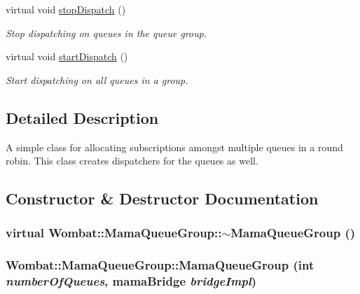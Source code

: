 \begin{DoxyCompactItemize}
virtual void \hyperlink{classWombat_1_1MamaQueueGroup_a90a5e2596ebda29af5bd7bdcdbb63828}{stopDispatch} ()
\begin{DoxyCompactList}\small\item\em Stop dispatching on queues in the queue group. \item\end{DoxyCompactList}\item 
virtual void \hyperlink{classWombat_1_1MamaQueueGroup_a8b0bd3a030e0cc5cab54b2d3347dd47c}{startDispatch} ()
\begin{DoxyCompactList}\small\item\em Start dispatching on all queues in a group. \item\end{DoxyCompactList}\end{DoxyCompactItemize}


\subsection{Detailed Description}
A simple class for allocating subscriptions amongst multiple queues in a round robin. This class creates dispatchers for the queues as well. 

\subsection{Constructor \& Destructor Documentation}
\hypertarget{classWombat_1_1MamaQueueGroup_aa24c28b26b494f159b8c7c5f5cb3e328}{
\subsubsection[{$\sim$MamaQueueGroup}]{\setlength{\rightskip}{0pt plus 5cm}virtual Wombat::MamaQueueGroup::$\sim$MamaQueueGroup ()}}
\label{classWombat_1_1MamaQueueGroup_aa24c28b26b494f159b8c7c5f5cb3e328}
\hypertarget{classWombat_1_1MamaQueueGroup_a132745778e569ecc287f7a21aaac7028}{
\subsubsection[{MamaQueueGroup}]{\setlength{\rightskip}{0pt plus 5cm}Wombat::MamaQueueGroup::MamaQueueGroup (int {\em numberOfQueues}, \/  mamaBridge {\em bridgeImpl})}}
\label{classWombat_1_1MamaQueueGroup_a132745778e569ecc287f7a21aaac7028}


